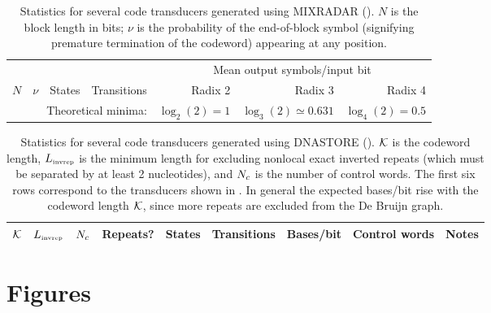 \documentclass[english]{article}
\begin{document}
\newpage
\begin{table}[h!t]
\begin{tabular}{rrrrrrr}
& & & & \multicolumn{3}{c}{Mean output symbols/input bit} \\
\cline{5-7}
$N$ & $\nu$ & States & Transitions & Radix 2 & Radix 3 & Radix 4 \\
\hline

\hline
\multicolumn{4}{r}{Theoretical minima:} & $\log_2(2) = 1$ & $\log_3(2) \simeq 0.631$ & $\log_4(2) = 0.5$
\end{tabular}
\caption{
  Statistics for several code transducers generated using MIXRADAR ().
$N$ is the block length in bits; $\nu$ is the probability of the end-of-block symbol
(signifying premature termination of the codeword) appearing at any position.
}
\end{table}

\newpage
\begin{table}[h!t]
  \begin{tabular}{rrrrrrrll}
    ${\cal K}$ & $L_{\mbox{\tiny invrep}}$ & $N_c$ & Repeats? & States & Transitions & Bases/bit & Control words & Notes \\
    \hline

\end{tabular}
\caption{
  Statistics for several code transducers generated using DNASTORE ().
  ${\cal K}$ is the codeword length,
  $L_{\mbox{\tiny invrep}}$ is the minimum length for excluding nonlocal exact inverted repeats
  (which must be separated by at least 2 nucleotides),
  and $N_c$ is the number of control words.
  The first six rows correspond to the transducers shown in .
  In general the expected bases/bit rise with the codeword length ${\cal K}$,
  since more repeats are excluded from the De Bruijn graph.
}
\end{table}

\newpage
\section{Figures}
\end{document}
